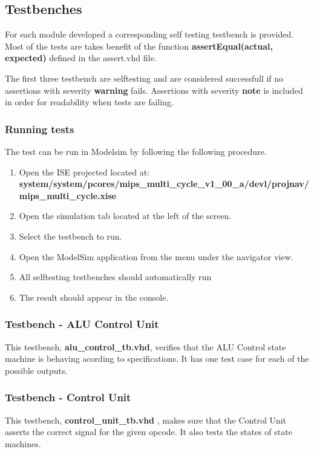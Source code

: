 \subsection{Testbenches}

For each module developed a corresponding self testing testbench is provided. Most of the tests are takes benefit of the function {\bf assertEqual(actual, expected) } defined in the assert.vhd file.

The first three testbench are selftesting and are considered successfull if no assertions with severity {\bf warning} fails. Assertions with severity {\bf note} is included in order for readability when tests are failing.

\subsubsection{Running tests}
The test can be run in Modelsim by following the following procedure.


\begin{enumerate}
\item Open the ISE projected located at:  \\ {\bf system/system/pcores/mips\_multi\_cycle\_v1\_00\_a/devl/projnav/mips\_multi\_cycle.xise}
\item Open the simulation tab located at the left of the screen. 
\item Select the testbench to run.
\item Open the ModelSim application from the menu under the navigator view. 
\item All selftesting testbenches should automatically run
\item The result should appear in the console. 
\end{enumerate}

\subsubsection{Testbench - ALU Control Unit}
This testbench, {\bf alu\_control\_tb.vhd}, verifies that the ALU Control state machine is behaving acording to specifications. It has one test case for each of the possible outputs.
\subsubsection{Testbench - Control Unit}
This testbench, {\bf control\_unit\_tb.vhd} , makes sure that the Control Unit asserts the correct signal for the given opcode. It also tests the states of state machines.
